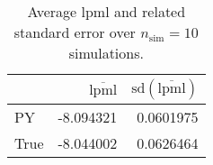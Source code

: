 \begin{table}[H]

\caption{Average lpml and related standard error over $n_{\text{sim}} = 10$ simulations.}
\centering
\begin{tabular}[t]{lrr}
\toprule
  & $\overbar{\text{lpml}}$ & $\text{sd}(\overbar{\text{lpml}})$\\
\midrule
PY & -8.094321 & 0.0601975\\
True & -8.044002 & 0.0626464\\
\bottomrule
\end{tabular}
\end{table}